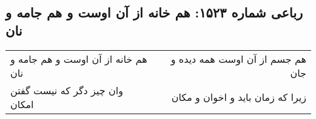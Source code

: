\begin{center}
\section*{رباعی شماره ۱۵۲۳: هم خانه از آن اوست و هم جامه و نان}
\label{sec:1523}
\begin{longtable}{l p{0.5cm} r}
هم خانه از آن اوست و هم جامه و نان
&&
هم جسم از آن اوست همه دیده و جان
\\
وان چیز دگر که نیست گفتن امکان
&&
زیرا که زمان باید و اخوان و مکان
\\
\end{longtable}
\end{center}
